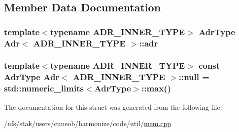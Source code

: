 \subsection{Member Data Documentation}
\hypertarget{structAdr_a657dd11fa4c28931f6c01f61f33db315}{
\subsubsection[{adr}]{\setlength{\rightskip}{0pt plus 5cm}template$<$typename A\-D\-R\-\_\-\-I\-N\-N\-E\-R\-\_\-\-T\-Y\-P\-E$>$ {\bf Adr\-Type} {\bf Adr}$<$ A\-D\-R\-\_\-\-I\-N\-N\-E\-R\-\_\-\-T\-Y\-P\-E $>$\-::adr}}\label{structAdr_a657dd11fa4c28931f6c01f61f33db315}
\hypertarget{structAdr_aa33d488b824b4f0b3a77928a9dec5dba}{
\subsubsection[{null}]{\setlength{\rightskip}{0pt plus 5cm}template$<$typename A\-D\-R\-\_\-\-I\-N\-N\-E\-R\-\_\-\-T\-Y\-P\-E$>$ const {\bf Adr\-Type} {\bf Adr}$<$ A\-D\-R\-\_\-\-I\-N\-N\-E\-R\-\_\-\-T\-Y\-P\-E $>$\-::null = std\-::numeric\-\_\-limits$<${\bf Adr\-Type}$>$\-::max()\hspace{0.3cm}{\ttfamily [static]}}}\label{structAdr_aa33d488b824b4f0b3a77928a9dec5dba}


The documentation for this struct was generated from the following file\-:\begin{DoxyCompactItemize}
\item 
/nfs/stak/users/cuneob/harmonize/code/util/\hyperlink{mem_8cpp}{mem.\-cpp}\end{DoxyCompactItemize}
